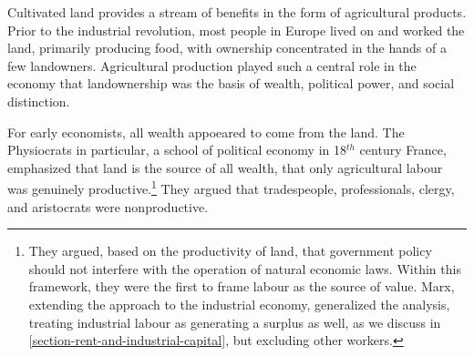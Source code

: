 Cultivated land provides a stream of benefits in the form of agricultural products.
Prior to the industrial revolution, most people in Europe lived on and worked the land, primarily producing food, with ownership concentrated in the hands of a few landowners.  Agricultural production played such a central role in the economy that landownership was the basis of wealth, political power, and social distinction.  %


For early economists, %
all wealth appoeared to come from the land. The Physiocrats in particular, a school of \gls{political economy} in 18$^{th}$ century France, emphasized that land is the source of all wealth, that only agricultural labour was genuinely productive.\footnote{They argued, based on the productivity of land, that government policy should not interfere with the operation of natural economic laws. Within this framework, they were the first to frame labour as the source of value. Marx, extending the approach to the industrial economy, generalized the analysis, treating industrial labour as generating a surplus as well, as we discuss in \ref{section-rent-and-industrial-capital}, but excluding other workers.} They argued that tradespeople, professionals, clergy, and aristocrats were nonproductive.

